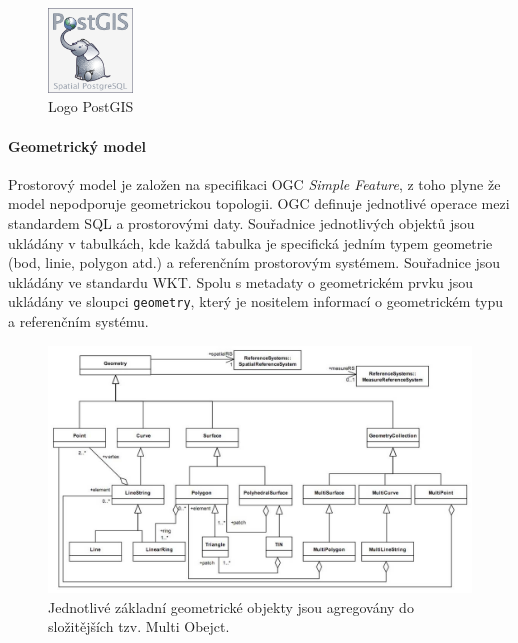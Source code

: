 \documentclass[a4paper,12pt,oneside]{report}
\begin{document}
  
\begin{figure}[h!]
    \centering
    \includegraphics[width=0.2\textwidth]{./img/implementace/postgis.png}
    \caption[Logo PostGIS]{\centering  Logo PostGIS \footnotemark}
 \end{figure}   

\paragraph*{Geometrický model} 
Prostorový model je založen na specifikaci \acs{OGC} \textit{Simple Feature}, z toho plyne že model nepodporuje geometrickou topologii. OGC definuje jednotlivé operace mezi standardem SQL a prostorovými daty. Souřadnice jednotlivých objektů jsou ukládány v tabulkách, kde každá tabulka je specifická jedním typem geometrie (bod, linie, polygon atd.) a referenčním prostorovým systémem. Souřadnice jsou ukládány ve standardu \acs{WKT}. Spolu s  metadaty o geometrickém prvku jsou ukládány ve sloupci \texttt{geometry}, který je  nositelem informací o geometrickém typu a referenčním systému.\cite{postgis}

\begin{figure}[h!]
    \centering
    \includegraphics[width=1\textwidth]{./img/implementace/ogc1.jpg}
    \caption[Model PostGIS]{\centering Jednotlivé základní geometrické objekty jsou agregovány do složitějších tzv. Multi Obejct.     \footnotemark}
 \end{figure}   
\end{document}
